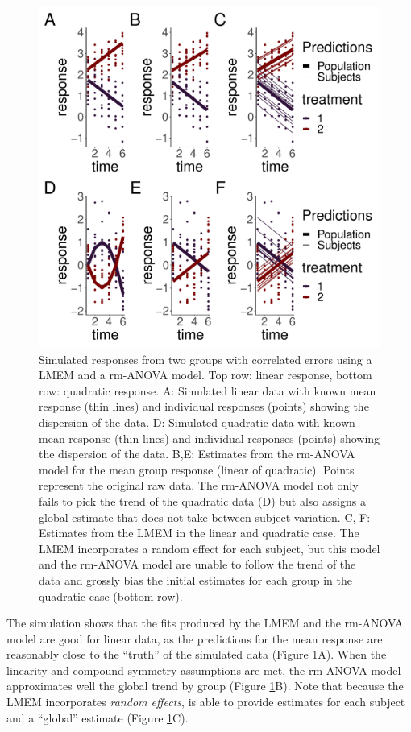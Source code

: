 \documentclass[
]{article}
\begin{document}
\begin{figure}

{\centering \includegraphics[width=0.75\linewidth]{00-Full_document_OUP_No_Appendix_files/figure-latex/l-q-response-1} 

}

\caption{Simulated responses from two groups with correlated errors using a LMEM and a rm-ANOVA model. Top row: linear response, bottom row: quadratic response. A: Simulated linear data with known mean response (thin lines) and individual responses (points) showing the dispersion of the data. D: Simulated quadratic data with known mean response (thin lines) and individual responses (points) showing the dispersion of the data. B,E: Estimates from the rm-ANOVA model for the mean group response (linear of quadratic). Points represent the original raw data. The rm-ANOVA model not only fails to pick the trend of the quadratic data (D) but also assigns a global estimate that does not take between-subject variation. C, F: Estimates from the LMEM in the linear and quadratic case. The LMEM incorporates a random effect for each subject, but this model and the rm-ANOVA model are unable to follow the trend of the data and grossly bias the initial estimates for each group in the quadratic case (bottom row).}\label{fig:l-q-response}
\end{figure}

The simulation shows that the fits produced by the LMEM and the rm-ANOVA model are good for linear data, as the predictions for the mean response are reasonably close to the ``truth'' of the simulated data (Figure \ref{fig:l-q-response}A). When the linearity and compound symmetry assumptions are met, the rm-ANOVA model approximates well the global trend by group (Figure \ref{fig:l-q-response}B). Note that because the LMEM incorporates \emph{random effects}, is able to provide estimates for each subject and a ``global'' estimate (Figure \ref{fig:l-q-response}C).
\end{document}
